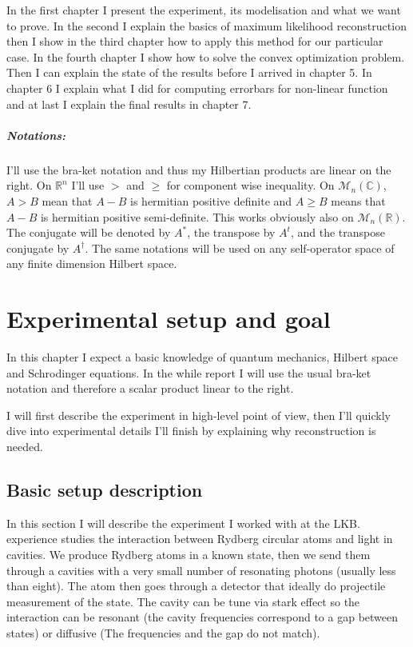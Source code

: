 \documentclass[10pt]{report}
\theoremstyle{plain}
\theoremstyle{definition}
\theoremstyle{remark}
\newcommand{\R}{\ensuremath{\mathbb{R}}}
\newcommand{\C}{\ensuremath{\mathbb{C}}}
\renewcommand{\geq}{\geqslant}
\begin{document}
In the first chapter I
present the experiment, its modelisation and what we want to prove. In the
second I explain the basics of maximum likelihood reconstruction then I show in
the third chapter how to apply this method for our particular case. In the
fourth chapter I show how to solve the convex optimization problem. Then I can
explain the state of the results before I arrived in chapter 5. In chapter 6 I
explain what I did for computing errorbars for non-linear function and at last
I explain the final results in chapter 7.

\vfill

\paragraph{Notations:} I'll use the bra-ket notation and thus my Hilbertian
products are linear on the right. On $\R^n$ I'll use $>$ and $\geq$ for
component wise inequality. On $\mathcal{M}_n(\C)$, $A > B$ mean that $A-B$ is hermitian
positive definite and $A \geq B$ means that $A - B$ is hermitian positive
semi-definite. This works obviously also on $\mathcal{M}_n(\R)$. The conjugate will be
denoted by $A^*$, the transpose by $A^t$, and the transpose conjugate by
$A^\dagger$. The same notations will be used on any self-operator space of any finite dimension
Hilbert space.


\chapter{Experimental setup and goal}

In this chapter I expect a basic knowledge of quantum mechanics, Hilbert space and
Schrodinger equations. In the while report I will use the usual bra-ket notation
and therefore a scalar product linear to the right.

I will first describe the experiment in high-level point of view, then I'll
quickly dive into experimental details I'll finish by explaining why
reconstruction is needed.

\section{Basic setup description}

In this section I will describe the experiment I worked with at the LKB.\@This
experience studies the interaction between Rydberg circular atoms and light in
cavities.
We produce Rydberg atoms in a known state, then we send them through a
cavities with a very small number of resonating photons (usually less than
eight). The atom then goes through a detector that ideally do projectile
measurement of the state. The cavity can be tune via stark effect so the
interaction can be resonant (the cavity frequencies correspond to a gap between
states) or diffusive (The frequencies and the gap do not match).
\end{document}

